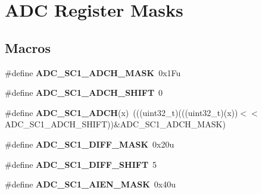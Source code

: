 \hypertarget{group___a_d_c___register___masks}{}\section{A\+DC Register Masks}
\label{group___a_d_c___register___masks}
\subsection*{Macros}
\begin{DoxyCompactItemize}
\item 
\mbox{\label{group___a_d_c___register___masks_ga7450ced3c2b2df20023c2152f1470640}} 
\#define {\bfseries A\+D\+C\+\_\+\+S\+C1\+\_\+\+A\+D\+C\+H\+\_\+\+M\+A\+SK}~0x1\+Fu
\item 
\mbox{\label{group___a_d_c___register___masks_gab2ba46d5132224f2920c1881e2c1b6fe}} 
\#define {\bfseries A\+D\+C\+\_\+\+S\+C1\+\_\+\+A\+D\+C\+H\+\_\+\+S\+H\+I\+FT}~0
\item 
\mbox{\label{group___a_d_c___register___masks_gab2ec3f01d5b560d3f839439b038f3981}} 
\#define {\bfseries A\+D\+C\+\_\+\+S\+C1\+\_\+\+A\+D\+CH}(x)~(((uint32\+\_\+t)(((uint32\+\_\+t)(x))$<$$<$A\+D\+C\+\_\+\+S\+C1\+\_\+\+A\+D\+C\+H\+\_\+\+S\+H\+I\+FT))\&A\+D\+C\+\_\+\+S\+C1\+\_\+\+A\+D\+C\+H\+\_\+\+M\+A\+SK)
\item 
\mbox{\label{group___a_d_c___register___masks_gadc514fb491cf08eb3fb0f27298388645}} 
\#define {\bfseries A\+D\+C\+\_\+\+S\+C1\+\_\+\+D\+I\+F\+F\+\_\+\+M\+A\+SK}~0x20u
\item 
\mbox{\label{group___a_d_c___register___masks_ga1385c936a9440856068dcb917ed9c658}} 
\#define {\bfseries A\+D\+C\+\_\+\+S\+C1\+\_\+\+D\+I\+F\+F\+\_\+\+S\+H\+I\+FT}~5
\item 
\mbox{\label{group___a_d_c___register___masks_gaa698d898e077003de10a42184de8f124}} 
\#define {\bfseries A\+D\+C\+\_\+\+S\+C1\+\_\+\+A\+I\+E\+N\+\_\+\+M\+A\+SK}~0x40u
\item 
\mbox{\label{group___a_d_c___register___masks_gaf2cde8fb207dd348e6313d6d0a5b3761}} 
$$
\end{DoxyCompactItemize}
